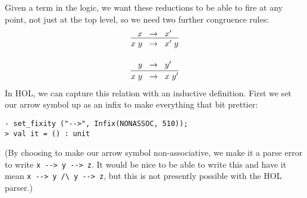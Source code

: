 \documentclass[12pt]{article}
\begin{document}
Given a term in the logic, we want these reductions to be able to fire
at any point, not just at the top level, so we need two further
congruence rules:\[
\begin{array}{l}
\infer{x\;y\;\;\rightarrow\;\;x'\;y}{x\;\;\rightarrow\;\;x'}\\[5mm]
\infer{x\;y\;\;\rightarrow\;\;x\;y'}{y\;\;\rightarrow\;\;y'}
\end{array}\]
In HOL, we can capture this relation with an inductive definition.
First we set our arrow symbol up as an infix to make everything that
bit prettier:
\begin{session}\begin{verbatim}
- set_fixity ("-->", Infix(NONASSOC, 510));
> val it = () : unit
\end{verbatim}\end{session}
    (By choosing to make our arrow symbol non-associative, we make it
    a parse error to write \verb!x --> y --> z!. It would be nice to
    be able to write this and have it mean \verb!x --> y /\ y --> z!,
    but this is not presently possible with the HOL parser.)
\end{document}
